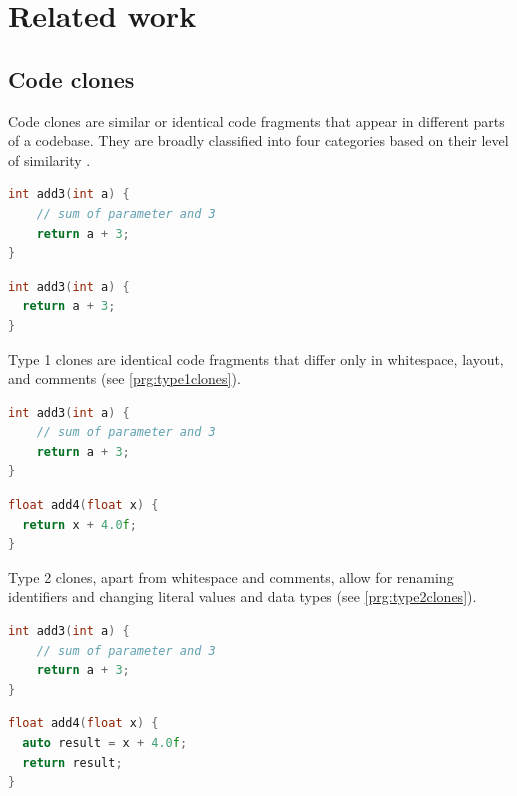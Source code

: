 \chapter{Related work} \label{sec:related}

\section{Code clones}

Code clones are similar or identical code fragments that appear in different parts of a codebase.
They are broadly classified into four categories based on their level of similarity \cite{bellon07,roy09}.

\begin{codepair}
\label{prg:type1clones}
\begin{lstlisting}[language=C++]
int add3(int a) {
    // sum of parameter and 3
    return a + 3;
}
\end{lstlisting}
\codepairsep
\begin{lstlisting}[language=C++]
int add3(int a) {
  return a + 3;
}
\end{lstlisting}
\end{codepair}

Type 1 clones are identical code fragments that differ only in whitespace, layout, and comments (see \autoref{prg:type1clones}).

\begin{codepair}
\label{prg:type2clones}
\begin{lstlisting}[language=C++]
int add3(int a) {
    // sum of parameter and 3
    return a + 3;
}
\end{lstlisting}
\codepairsep
\begin{lstlisting}[language=C++]
float add4(float x) {
  return x + 4.0f;
}
\end{lstlisting}
\end{codepair}

Type 2 clones, apart from whitespace and comments, allow for renaming identifiers and changing literal values and data types (see \autoref{prg:type2clones}).

\begin{codepair}
\label{prg:type3clones}
\begin{lstlisting}[language=C++]
int add3(int a) {
    // sum of parameter and 3
    return a + 3;
}
\end{lstlisting}
\codepairsep
\begin{lstlisting}[language=C++]
float add4(float x) {
  auto result = x + 4.0f;
  return result;
}
\end{lstlisting}
\end{codepair}


